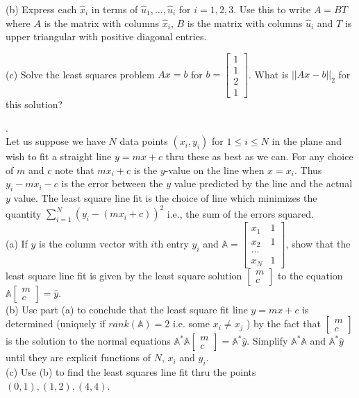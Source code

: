 \documentclass[12 pt]{article}
\begin{document}
\noindent
(b) Express each $\hat{x}_i$ in terms of $\hat{u}_1, \dots, \hat{u}_i$ for 
$i=1,2,3$. Use this to write $A=BT$ where $A$ is the matrix with columns $\hat{x}_i$, $B$ is the matrix with columns $\hat{u}_i$ and 
$T$ is upper triangular with positive diagonal entries.

\noindent
(c) Solve the least squares problem $Ax=b$ for $b=\begin{bmatrix} 1 \\ 1 \\ 2 \\ 1 \end{bmatrix}$. What is $||Ax-b||_2$ for this solution?

\medskip

. \\ Let us suppose we have $N$ data points $(x_i,y_i)$ for $1 \leq i \leq N$ in the plane and wish to fit a straight line $y=mx+c$ thru these as best as we can. For any choice of $m$ and $c$ note that $mx_i+c$ is the $y$-value on the line when $x=x_i$. Thus $y_i-mx_i-c$ is the error between the $y$ value 
predicted by the line and the actual $y$ value. The least square line fit is the choice of line which minimizes the quantity 
$\sum_{i=1}^N (y_i-(mx_i+c))^2$ i.e., the sum of the errors squared. \\

\noindent
(a) If $\hat{y}$ is the column vector with $i$th entry $y_i$ and 
$\mathbb{A} =\begin{bmatrix} x_1 & 1 \\ x_2 & 1 \\ \dots \\ x_N & 1 \end{bmatrix}$, show that the least square line fit is given by the least square solution 
$\begin{bmatrix} m \\ c \end{bmatrix}$ to the equation $\mathbb{A} \begin{bmatrix} m \\ c \end{bmatrix} = \hat{y}$. \\

\noindent
(b) Use part (a) to conclude that the least square fit line $y=mx+c$ is determined (uniquely if $rank(\mathbb{A})=2$ i.e. some $x_i \neq x_j$ ) by the fact that $\begin{bmatrix} m \\ c \end{bmatrix}$ 
is the solution to the normal equations $\mathbb{A}^* \mathbb{A} \begin{bmatrix} m \\ c \end{bmatrix} =\mathbb{A}^* \hat{y}$. Simplify $\mathbb{A}^*\mathbb{A}$ and 
$\mathbb{A}^* \hat{y}$ until they are explicit functions of $N$, $x_i$ and $y_i$. \\

\noindent
(c) Use (b) to find the least squares line fit thru the points $(0,1), (1,2), (4,4)$.
\end{document}

